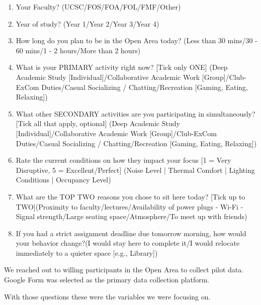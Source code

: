 \documentclass[12pt, a4paper]{report}
\begin{document}
\begin{enumerate}
\item Your Faculty? (UCSC/FOS/FOA/FOL/FMF/Other)
\item Year of study? (Year 1/Year 2/Year 3/Year 4)
\item How long do you plan to be in the Open Area today? (Less than 30 mins/30 - 60 mins/1 - 2 hours/More than 2 hours)
\item What is your PRIMARY activity right now? [Tick only ONE] (Deep Academic Study [Individual]/Collaborative Academic Work [Group]/Club-ExCom Duties/Casual Socializing / Chatting/Recreation [Gaming, Eating, Relaxing])
\item What other SECONDARY activities are you participating in simultaneously? [Tick all that apply, optional] (Deep Academic Study [Individual]/Collaborative Academic Work [Group]/Club-ExCom Duties/Casual Socializing / Chatting/Recreation [Gaming, Eating, Relaxing])
\item Rate the current conditions on how they impact your focus [1 = Very Disruptive, 5 = Excellent/Perfect] (Noise Level | Thermal Comfort | Lighting Conditions | Occupancy Level)
\item What are the TOP TWO reasons you chose to sit here today? [Tick up to TWO](Proximity to faculty/lectures/Availability of power plugs - Wi-Fi - Signal strength/Large seating space/Atmosphere/To meet up with friends)
\item If you had a strict assignment deadline due tomorrow morning, how would your behavior change?(I would stay here to complete it/I would relocate immediately to a quieter space [e.g., Library])
\end{enumerate}

\clearpage

We reached out to willing participants in the Open Area to collect pilot data. Google Form was selected as the primary data collection platform.

\vspace{1cm}

With those questions these were the variables we were focusing on.
\end{document}
